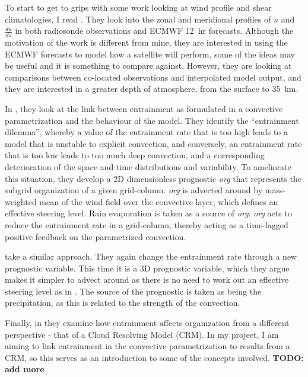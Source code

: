 \documentclass[11pt,a4paper]{article}
\newcommand\todo[1]{\textbf{TODO: #1}}
\begin{document}

To start to get to grips with some work looking at wind profile and shear climatologies, I read \cite{houchi2010comparison}. They look into the zonal and meridional profiles of $u$ and $\frac{du}{dz}$ in both radiosonde observations and ECMWF \SI{12}{hr} forecasts. Although the motivation of the work is different from mine, they are interested in using the ECMWF forecasts to model how a satellite will perform, some of the ideas may be useful and it is something to compare against. However, they are looking at comparisons between co-located observations and interpolated model output, and they are interested in a greater depth of atmosphere, from the surface to \SI{35}{km}.

In \cite{mapes2011parameterizing}, they look at the link between entrainment as formulated in a convective parametrization and the behaviour of the model. They identify the ``entrainment dilemma'', whereby a value of the entrainment rate that is too high leads to a model that is unstable to explicit convection, and conversely, an entrainment rate that is too low leads to too much deep convection, and a corresponding deterioration of the space and time distributions and variability. To ameliorate this situation, they develop a 2D dimensionless prognostic \textit{org} that represents the subgrid organization of a given grid-column. \textit{org} is advected around by mass-weighted mean of the wind field over the convective layer, which defines an effective steering level. Rain evaporation is taken as a source of \textit{org}. \textit{org} acts to reduce the entrainment rate in a grid-column, thereby acting as a time-lagged positive feedback on the parametrized convection. 

\cite{willett2017simple} take a similar approach. They again change the entrainment rate through a new prognostic variable. This time it is a 3D prognostic variable, which they argue makes it simpler to advect around as there is no need to work out an effective steering level as in \cite{mapes2011parameterizing}. The source of the prognostic is taken as being the precipitation, as this is related to the strength of the convection.

Finally, in \cite{tompkins2017organization} they examine how entrainment affects organization from a different perspective - that of a Cloud Resolving Model (CRM). In my project, I am aiming to link entrainment in the convective parametrization to results from a CRM, so this serves as an introduction to some of the concepts involved. \todo{add more}
\end{document}
